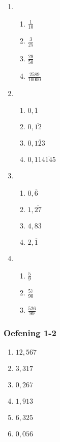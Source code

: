 {\begin{multicols}{3}
\begin{enumerate}[noitemsep, label=\textbf{\arabic*}. ]
 \item %
    \begin{enumerate}[noitemsep, label=\textbf{(\alph*)} ] 
    \item $\frac{1}{10}$
    \item $\frac{3}{25}$%
    \item $\frac{29}{50}$%
    \item $\frac{2589}{10000}$%
    \end{enumerate}
\item%
    \begin{enumerate}[noitemsep, label=\textbf{(\alph*)} ] 
    \item $0,\overline{1}$%
    \item $0,\overline{12}$%
    \item $0,\overline{123}$%
    \item $0,11\overline{4145}$%
    \end{enumerate}
\item %
    \begin{enumerate}[noitemsep, label=\textbf{(\alph*)} ] 
    \item $0,\overline{6}$%
    \item $1,\overline{27}$%
    \item $4,8\overline{3}$%
    \item $2,\overline{1}$%
    \end{enumerate}
\item %
    \begin{enumerate}[noitemsep, label=\textbf{(\alph*)} ] 
    \item $\frac{5}{9}$%
    \item $\frac{57}{90}$%
    \item $\frac{526}{99}$%
    \end{enumerate}
\end{enumerate}

\subsubsection*{Oefening 1-2} %

\begin{enumerate}[noitemsep, label=\textbf{\arabic*}. ]
\item $12,567$%
\item $3,317$%
\item $0,267$%
\item $1,913$
\item $6,325$%
\item $0,056$%
\end{enumerate}



\end{multicols}}
